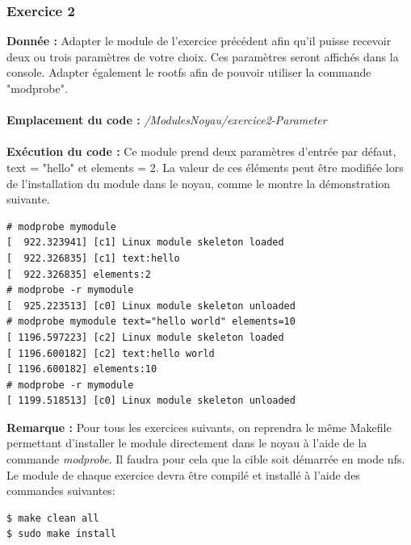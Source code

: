 \subsubsection{Exercice 2}
\textbf{Donnée : } Adapter	le	module	de	l’exercice	précédent	afin	qu’il	puisse	recevoir	deux	ou	trois paramètres de	votre	choix.	Ces	paramètres	seront	affichés dans	la	console.	Adapter	également	le rootfs	afin	de	pouvoir	utiliser	la	commande	"modprobe".\\\\
\textbf{Emplacement du code : } \textit{/ModulesNoyau/exercice2-Parameter}\\\\
\textbf{Exécution du code : }Ce module prend deux paramètres d'entrée par défaut, text = "hello" et elements = 2. La valeur de ces éléments peut être modifiée lors de l'installation du module dans le noyau, comme le montre la démonstration suivante.
\begin{lstlisting}
# modprobe mymodule                                                             
[  922.323941] [c1] Linux module skeleton loaded                                
[  922.326835] [c1] text:hello                                                  
[  922.326835] elements:2                                                       
# modprobe -r mymodule                                                          
[  925.223513] [c0] Linux module skeleton unloaded                         
# modprobe mymodule text="hello world" elements=10                              
[ 1196.597223] [c2] Linux module skeleton loaded                                
[ 1196.600182] [c2] text:hello world                                            
[ 1196.600182] elements:10                                                      
# modprobe -r mymodule                                                          
[ 1199.518513] [c0] Linux module skeleton unloaded  
\end{lstlisting}
\textbf{Remarque : } Pour tous les exercices suivants, on reprendra le même Makefile permettant d'installer le module directement dans le noyau à l'aide de la commande \textit{modprobe}. Il faudra pour cela que la cible soit démarrée en mode nfs. Le module de chaque exercice devra être compilé et installé à l'aide des commandes suivantes:
\begin{lstlisting}
$ make clean all
$ sudo make install
\end{lstlisting}
